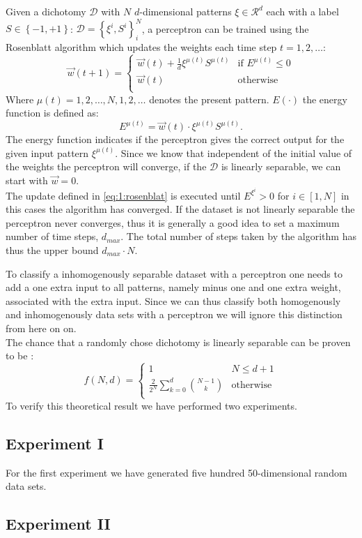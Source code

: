 Given a dichotomy $\mathcal{D}$ with $N$ $d$-dimensional patterns $\xi \in \mathcal{R}^d$ each with a label $S \in \left\{-1, +1 \right\}$: $\mathcal{D} = \left\{\xi^i, S^i \right\}_{i}^{N}$, a perceptron can be trained using the Rosenblatt algorithm which updates the weights each time step $t = 1, 2, \ldots$:
	\begin{equation}\label{eq:1:rosenblat}
		\vec{w}(t+1) = 
		\begin{cases}
		\vec{w}(t) + \frac{1}{d} \xi^{\mu(t)} S^{\mu(t)}
		& \text{if } E^{\mu(t)} \leq 0\\
		\vec{w}(t) 											
		& \text{otherwise}\\
		\end{cases}
	\end{equation}
Where $\mu(t) = 1, 2, \ldots, N, 1, 2, \ldots$ denotes the present pattern. $E(\cdot)$ the energy function is defined as:
	\begin{equation}\label{eq:1:energyFunction}
		E^{\mu(t)} = \vec{w}(t) \cdot \xi^{\mu(t)}S^{\mu(t)}.
	\end{equation}
The energy function indicates if the perceptron gives the correct output for the given input pattern $\xi^{\mu(t)}$. Since we know that independent of the initial value of the weights the perceptron will converge, if the $\mathcal{D}$ is linearly separable, we can start with $\vec{w} = 0$.\\

The update defined in \autoref{eq:1:rosenblat} is executed until $E^{\xi^i} > 0$ for $i \in [1, N]$ in this cases the algorithm has converged. If the dataset is not linearly separable the perceptron never converges, thus it is generally a good idea to set a maximum number of time steps, $d_{max}$. The total number of steps taken by the algorithm has thus the upper bound $d_{max} \cdot N$. 

To classify a inhomogenously separable dataset with a perceptron one needs to add a one extra input to all patterns, namely minus one and one extra weight, associated with the extra input. Since we can thus classify both homogenously and inhomogenously data sets with a perceptron we will ignore this distinction from here on on.\\

The chance that a randomly chose dichotomy is linearly separable can be proven to be \cite{reed1998neural}:
	\begin{equation}\label{eq:1:lsChance}
		f(N,d) = 
		\begin{cases}
		1
		& N \leq d + 1\\
		\frac{2}{2^N} \sum_{k = 0}^{d} \binom{N - 1}{k}										
		& \text{otherwise}\\
		\end{cases}
	\end{equation}
To verify this theoretical result we have performed two experiments.

\subsection*{Experiment I}
For the first experiment we have generated five hundred 50-dimensional random data sets. 

\subsection*{Experiment II}



